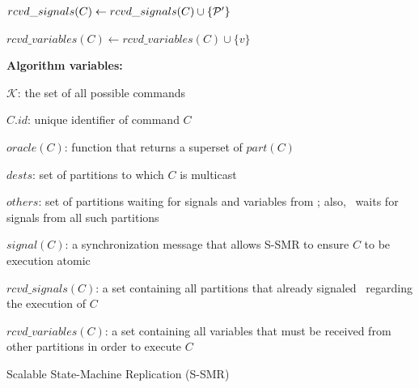 \begin{algorithm}
\begin{distribalgo}[1]
	\vspace{2.0mm}
	    \STATE $rcvd\_signals(C) \leftarrow rcvd\_signals(C) \cup \{\mathcal{P}'\}$
	\ENDINDENT

	\vspace{2.0mm}
	    \STATE $rcvd\_variables(C) \leftarrow rcvd\_variables(C) \cup \{v\}$
	\ENDINDENT
			
\ENDINDENT

\vspace{1.5mm}

\textbf{Algorithm variables:}

\vspace{1mm}

$\mathcal{K}$: the set of all possible commands

\vspace{1mm}

$C.id$: unique identifier of command $C$

\vspace{1mm}

$oracle(C)$: function that returns a superset of $part(C)$

\vspace{1mm}

$dests$: set of partitions to which $C$ is multicast

\vspace{1mm}

$others$: set of partitions waiting for signals and variables from \pp; also, \pp\ waits for signals from all such partitions

\vspace{1mm}

$signal(C)$: a synchronization message that allows S-SMR to ensure $C$ to be execution atomic

\vspace{1mm}

$rcvd\_signals(C)$: a set containing all partitions that already signaled \pp\ regarding the execution of $C$

\vspace{1mm}

$rcvd\_variables(C)$: a set containing all variables that must be received from other partitions in order to execute $C$

\caption{Scalable State-Machine Replication (S-SMR)}
\label{alg:ssmr}
\end{distribalgo}
\end{algorithm}

